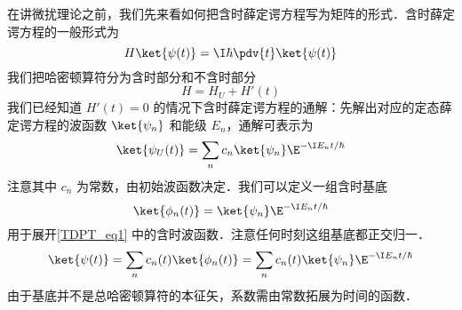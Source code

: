 
在讲微扰理论之前，我们先来看如何把含时薛定谔方程写为矩阵的形式．含时薛定谔方程的一般形式为
\begin{equation}\label{TDPT_eq1}
H \ket{\psi(t)} = \I\hbar \pdv{t} \ket{\psi(t)}
\end{equation}
我们把哈密顿算符分为含时部分和不含时部分
\begin{equation}
H = H_U + H'(t)
\end{equation}
我们已经知道 %
$H'(t) = 0$ 的情况下含时薛定谔方程的通解：先解出对应的定态薛定谔方程的波函数 $\ket{\psi_n}$ 和能级 $E_n$，通解可表示为
\begin{equation}
\ket{\psi_U(t)} = \sum_n c_n \ket{\psi_n} \E^{-\I E_n t/\hbar}
\end{equation}
注意其中 $c_n$ 为常数，由初始波函数决定．我们可以定义一组含时基底
\begin{equation}
\ket{\phi_n(t)} = \ket{\psi_n} \E^{-\I E_n t/\hbar}
\end{equation}
用于展开\autoref{TDPT_eq1} 中的含时波函数．注意任何时刻这组基底都正交归一．
\begin{equation}
\ket{\psi(t)} = \sum_n c_n(t) \ket{\phi_n(t)} = \sum_n c_n(t) \ket{\psi_n} \E^{-\I E_n t/\hbar}
\end{equation}
由于基底并不是总哈密顿算符的本征矢，系数需由常数拓展为时间的函数．

